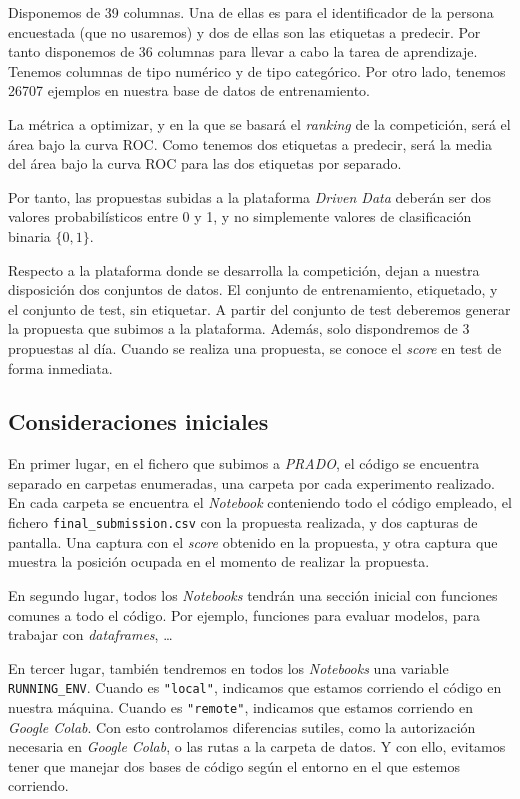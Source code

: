 \documentclass[11pt]{article}
\begin{document}
Disponemos de 39 columnas. Una de ellas es para el identificador de la persona encuestada (que no usaremos) y dos de ellas son las etiquetas a predecir. Por tanto disponemos de 36 columnas para llevar a cabo la tarea de aprendizaje. Tenemos columnas de tipo numérico y de tipo categórico. Por otro lado, tenemos 26707 ejemplos en nuestra base de datos de entrenamiento.

La métrica a optimizar, y en la que se basará el \emph{ranking} de la competición, será el área bajo la curva ROC. Como tenemos dos etiquetas a predecir, será la media del área bajo la curva ROC para las dos etiquetas por separado.

Por tanto, las propuestas subidas a la plataforma \emph{Driven Data} deberán ser dos valores probabilísticos entre 0 y 1, y no simplemente valores de clasificación binaria $\{0, 1\}$.

Respecto a la plataforma donde se desarrolla la competición, dejan a nuestra disposición dos conjuntos de datos. El conjunto de entrenamiento, etiquetado, y el conjunto de test, sin etiquetar. A partir del conjunto de test deberemos generar la propuesta que subimos a la plataforma. Además, solo dispondremos de 3 propuestas al día. Cuando se realiza una propuesta, se conoce el \emph{score} en test de forma inmediata.

\subsection{Consideraciones iniciales}

En primer lugar, en el fichero que subimos a \emph{PRADO}, el código se encuentra separado en carpetas enumeradas, una carpeta por cada experimento realizado. En cada carpeta se encuentra el \emph{Notebook} conteniendo todo el código empleado, el fichero \lstinline{final_submission.csv} con la propuesta realizada, y dos capturas de pantalla. Una captura con el \emph{score} obtenido en la propuesta, y otra captura que muestra la posición ocupada en el momento de realizar la propuesta.

En segundo lugar, todos los \emph{Notebooks} tendrán una sección inicial con funciones comunes a todo el código. Por ejemplo, funciones para evaluar modelos, para trabajar con \emph{dataframes}, \ldots

En tercer lugar, también tendremos en todos los \emph{Notebooks} una variable \lstinline{RUNNING_ENV}. Cuando es \lstinline{"local"}, indicamos que estamos corriendo el código en nuestra máquina. Cuando es \lstinline{"remote"}, indicamos que estamos corriendo en \emph{Google Colab}. Con esto controlamos diferencias sutiles, como la autorización necesaria en \emph{Google Colab}, o las rutas a la carpeta de datos. Y con ello, evitamos tener que manejar dos bases de código según el entorno en el que estemos corriendo.
\end{document}

